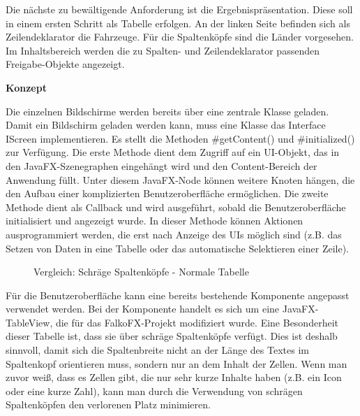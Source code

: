 Die nächste zu bewältigende Anforderung ist die Ergebnispräsentation. Diese soll in einem ersten Schritt als Tabelle erfolgen. An der linken Seite befinden sich als Zeilendeklarator die Fahrzeuge. Für die Spaltenköpfe sind die Länder vorgesehen. Im Inhaltsbereich werden die zu Spalten- und Zeilendeklarator passenden Freigabe-Objekte angezeigt. 

\textbf{Konzept}

Die einzelnen Bildschirme werden bereits über eine zentrale Klasse geladen. Damit ein Bildschirm geladen werden kann, muss eine Klasse das Interface IScreen implementieren. Es stellt die Methoden \#getContent() und \#initialized() zur Verfügung. Die erste Methode dient dem Zugriff auf ein UI-Objekt, das in den JavaFX-Szenegraphen eingehängt wird und den Content-Bereich der Anwendung füllt. Unter diesem JavaFX-Node können weitere Knoten hängen, die den Aufbau einer komplizierten Benutzeroberfläche ermöglichen. Die zweite Methode dient als Callback und wird ausgeführt, sobald die Benutzeroberfläche initialisiert und angezeigt wurde. In dieser Methode können Aktionen ausprogrammiert werden, die erst nach Anzeige des UIs möglich sind (z.B. das Setzen von Daten in eine Tabelle oder das automatische Selektieren einer Zeile).

\begin{figure}[H] 
	\centering
	\hspace{2.0em}
	\caption{Vergleich: Schräge Spaltenköpfe - Normale Tabelle}
	\label{fig:tabelle1}
\end{figure}



Für die Benutzeroberfläche kann eine bereits bestehende Komponente angepasst verwendet werden. Bei der Komponente handelt es sich um eine JavaFX-TableView, die für das FalkoFX-Projekt modifiziert wurde. Eine Besonderheit dieser Tabelle ist, dass sie über schräge Spaltenköpfe verfügt. Dies ist deshalb sinnvoll, damit sich die Spaltenbreite nicht an der Länge des Textes im Spaltenkopf orientieren muss, sondern nur an dem Inhalt der Zellen. Wenn man zuvor weiß, dass es Zellen gibt, die nur sehr kurze Inhalte haben (z.B. ein Icon oder eine kurze Zahl), kann man durch die Verwendung von schrägen Spaltenköpfen den verlorenen Platz minimieren.

